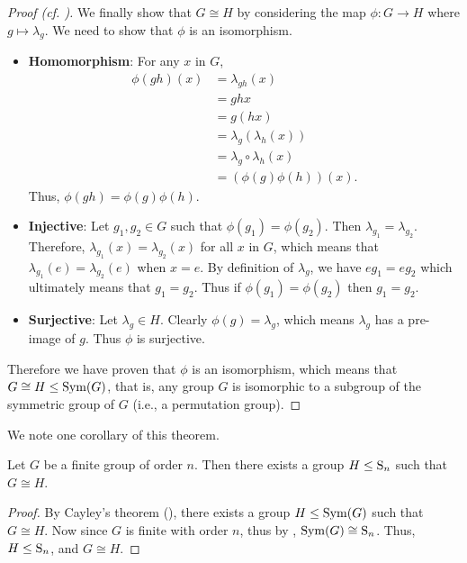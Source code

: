 \begin{proof}[Proof (cf. {\cite[Proof 2]{proofwiki_cayleytheorem}})]
    We finally show that $G \cong H$ by considering the map $\phi: G\to H$ where $g \mapsto \lambda_g$. We need to show that $\phi$ is an isomorphism.
    \begin{itemize}
        \item \textbf{Homomorphism}: For any $x$ in $G$,
            \begin{align*}
                \phi(gh)(x) &= \lambda_{gh}(x)\\
                &= ghx\\
                &= g(hx)\\
                &= \lambda_g\left(\lambda_h(x)\right)\\
                &= \lambda_g\circ\lambda_h(x)\\
                &= (\phi(g)\phi(h))(x).
            \end{align*}
            Thus, $\phi(gh) = \phi(g)\phi(h)$.
        
        \item \textbf{Injective}: Let $g_1, g_2 \in G$ such that $\phi(g_1) = \phi(g_2)$. Then $\lambda_{g_1} = \lambda_{g_2}$. Therefore, $\lambda_{g_1}(x) = \lambda_{g_2}(x)$ for all $x$ in $G$, which means that $\lambda_{g_1}(e) = \lambda_{g_2}(e)$ when $x = e$. By definition of $\lambda_g$, we have $eg_1 = eg_2$ which ultimately means that $g_1=g_2$. Thus if $\phi(g_1) = \phi(g_2)$ then $g_1=g_2$.
        
        \item \textbf{Surjective}: Let $\lambda_g \in H$. Clearly $\phi(g) = \lambda_g$, which means $\lambda_g$ has a pre-image of $g$. Thus $\phi$ is surjective.
    \end{itemize}
    Therefore we have proven that $\phi$ is an isomorphism, which means that $G \cong H \leq \mathrm{Sym}(G)$, that is, any group $G$ is isomorphic to a subgroup of the symmetric group of $G$ (i.e., a permutation group).
\end{proof}

We note one corollary of this theorem.
\begin{corollary}
    Let $G$ be a finite group of order $n$. Then there exists a group $H \leq \mathrm{S}_{n}$ such that $G \cong H$.
\end{corollary}
\begin{proof}
    By Cayley's theorem (), there exists a group $H \leq \mathrm{Sym}(G)$ such that $G \cong H$. Now since $G$ is finite with order $n$, thus by , $\mathrm{Sym}(G) \cong \mathrm{S}_{n}$. Thus, $H \leq \mathrm{S}_{n}$, and $G \cong H$.
\end{proof}

